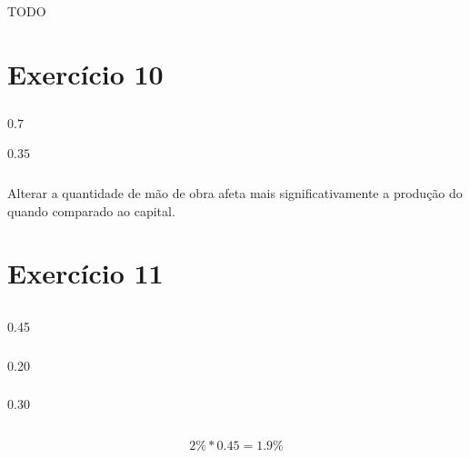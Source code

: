 \documentclass{article}
\begin{document}
\subsection{}
TODO

\section{Exercício 10}
\subsection{}

\subsubsection{}
\(0.7\)

\subsubsection{}
\(0.35\)

\subsection{}

Alterar a quantidade de mão de obra afeta mais significativamente a produção do
quando comparado ao capital.

\section{Exercício 11}
\subsection{}
\subsubsection{}
0.45
\subsubsection{}
0.20
\subsubsection{}
0.30

\subsection{}
\[
	2\% * 0.45 = 1.9\%
\]
\end{document}
